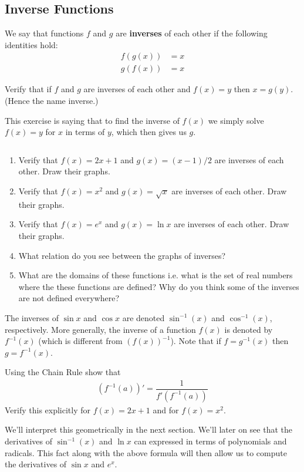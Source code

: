 \subsection{Inverse Functions}
We say that functions $f$ and $g$ are {\bf inverses} of each other if the following identities hold:
\begin{align*}
	f (g(x)) & = x \\
	g(f(x))  & = x
\end{align*}

\begin{exercise}
	Verify that if $f$ and $g$ are inverses of each other and $f(x) = y$ then $x = g(y)$. (Hence the name inverse.)
\end{exercise}
This exercise is saying that to find the inverse of $f(x)$ we simply solve $f(x) = y$ for $x$ in terms of $y$, which then gives us $g$.


\begin{exercise}$ $
	\begin{enumerate}
		\item Verify that $f(x) = 2x + 1$ and $g(x) = (x-1)/2$ are inverses of each other. Draw their graphs.
		\item Verify that $f(x) = x^2$ and $g(x) = \sqrt{x}$ are inverses of each other. Draw their graphs.
		\item Verify that $f(x) = e^x$ and $g(x) = \ln x$ are inverses of each other.
		      Draw their graphs.
		\item What relation do you see between the graphs of inverses?
		\item What are the domains of these functions i.e. what is the set of real numbers where the these functions are defined? Why do you think some of the inverses are not defined everywhere?
	\end{enumerate}
\end{exercise}

The inverses of $\sin x$ and $ \cos x$ are denoted $\sin^{-1} (x)$ and $\cos^{-1} (x)$, respectively. More generally, the inverse of a function $f(x)$ is denoted by $f^{-1}(x)$ (which is different from $(f(x))^{-1}$). Note that if $f = g^{-1}(x)$ then $g = f^{-1}(x)$.

\begin{exercise}
	Using the Chain Rule show that
	\begin{align*}
		\left(f^{-1}(a)\right)'= \dfrac{1}{f'(f^{-1}(a))}
	\end{align*}
	Verify this explicitly for $f(x) = 2x+1$ and for $f(x) = x^2$.
\end{exercise}
We'll interpret this geometrically in the next section. We'll later on see that the derivatives of $\sin^{-1}(x)$ and $\ln x$ can expressed in terms of polynomials and radicals. This fact along with the above formula will then allow us to compute the derivatives of $\sin x$ and $e^x$.








